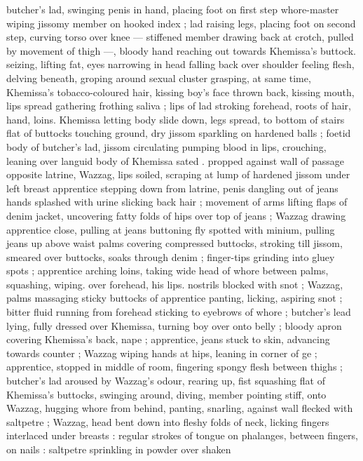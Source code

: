 butcher's lad, swinging penis in hand, placing foot on first step 
whore-master wiping jissomy member on hooked index ; lad raising 
legs, placing foot on second step, curving torso over knee --- 
stiffened member drawing back at crotch, pulled by movement of 
thigh ---, bloody hand reaching out towards Khemissa's buttock. 
seizing, lifting fat, eyes narrowing in head falling back over shoulder 
feeling flesh, delving beneath, groping around sexual cluster 
grasping, at same time, Khemissa's tobacco-coloured hair, kissing 
boy's face thrown back, kissing mouth, lips spread gathering frothing 
saliva ; lips of lad stroking forehead, roots of hair, hand, loins. 
Khemissa letting body slide down, legs spread, to bottom of stairs 
flat of buttocks touching ground, dry jissom sparkling on hardened 
balls ; foetid body of butcher's lad, jissom circulating pumping blood 
in lips, crouching, leaning over languid body of Khemissa sated . 
propped against wall of passage opposite latrine, Wazzag, lips 
soiled, scraping at lump of hardened jissom under left breast 
apprentice stepping down from latrine, penis dangling out of jeans 
hands splashed with urine slicking back hair ; movement of arms 
lifting flaps of denim jacket, uncovering fatty folds of hips over top 
of jeans ; Wazzag drawing apprentice close, pulling at jeans 
buttoning fly spotted with minium, pulling jeans up above waist 
palms covering compressed buttocks, stroking till jissom, smeared 
over buttocks, soaks through denim ; finger-tips grinding into gluey 
spots ; apprentice arching loins, taking wide head of whore between 
palms, squashing, wiping. over forehead, his lips. nostrils blocked 
with snot ; Wazzag, palms massaging sticky buttocks of apprentice 
panting, licking, aspiring snot ; bitter fluid running from forehead 
sticking to eyebrows of whore ; butcher's lead lying, fully dressed 
over Khemissa, turning boy over onto belly ; bloody apron covering 
Khemissa's back, nape ; apprentice, jeans stuck to skin, advancing 
towards counter ; Wazzag wiping hands at hips, leaning in corner of 
ge ; apprentice, stopped in middle of room, fingering spongy 
flesh between thighs ; butcher's lad aroused by Wazzag's odour, 
rearing up, fist squashing flat of Khemissa's buttocks, swinging 
around, diving, member pointing stiff, onto Wazzag, hugging whore 
from behind, panting, snarling, against wall flecked with saltpetre ; 
Wazzag, head bent down into fleshy folds of neck, licking fingers 
interlaced under breasts : regular strokes of tongue on phalanges, 
between fingers, on nails : saltpetre sprinkling in powder over shaken 
